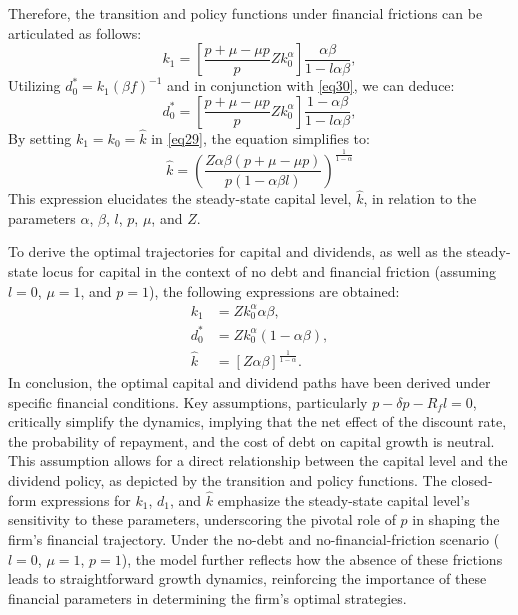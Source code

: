 \documentclass[12pt]{report}
\begin{document}
Therefore, the transition and policy functions under financial frictions can be articulated as follows:
\begin{equation}
    k_1 = \left[ \frac{p + \mu - \mu p}{p}Z k_0^{\alpha}\right] \frac{\alpha\beta}{1-l\alpha\beta}, \label{eq29}
\end{equation}
Utilizing \(d^*_0 = k_1(\beta f)^{-1}\) and in conjunction with \autoref{eq30}, we can deduce:
\begin{equation}
    d^*_0 = \left[ \frac{p + \mu - \mu p}{p}Z k_0^{\alpha}\right] \frac{1-\alpha\beta}{1-l\alpha\beta} \label{eq31},
\end{equation}
By setting \(k_1 = k_0 = \hat{k}\) in \autoref{eq29}, the equation simplifies to:
\begin{equation}
    \hat{k} = \left(\frac{Z \alpha \beta (p + \mu - \mu p)}{p(1 - \alpha \beta l)}\right)^{\frac{1}{1-\alpha}} \label{eq33}
\end{equation}
This expression elucidates the steady-state capital level, \(\hat{k}\), in relation to the parameters \(\alpha\), \(\beta\), \(l\), \(p\), \(\mu\), and \(Z\).

To derive the optimal trajectories for capital and dividends, as well as the steady-state locus for capital in the context of no debt and financial friction (assuming \(l = 0\), \(\mu = 1\), and \(p = 1\)), the following expressions are obtained:
\begin{align}
    k_1 &= Z k_0^{\alpha}\alpha\beta, \\
    d^*_0 &= Z k_0^{\alpha}(1-\alpha\beta), \\
    \hat{k} &= \left[Z \alpha \beta \right]^{\frac{1}{1-\alpha}}.
\end{align}
In conclusion, the optimal capital and dividend paths have been derived under specific financial conditions. Key
assumptions, particularly \( p - \delta p - R_f l = 0 \), critically simplify the dynamics, implying that the net effect
of the discount rate, the probability of repayment, and the cost of debt on capital growth is neutral. This assumption
allows for a direct relationship between the capital level and the dividend policy, as depicted by the transition and
policy functions. The closed-form expressions for \( k_1 \), \( d_1 \), and \( \hat{k} \) emphasize the steady-state
capital level's sensitivity to these parameters, underscoring the pivotal role of \( p \) in shaping the firm's
financial trajectory. Under the no-debt and no-financial-friction scenario (\( l = 0 \), \( \mu = 1 \), \( p = 1 \)),
the model further reflects how the absence of these frictions leads to straightforward growth dynamics, reinforcing the
importance of these financial parameters in determining the firm's optimal strategies. 
\end{document}
